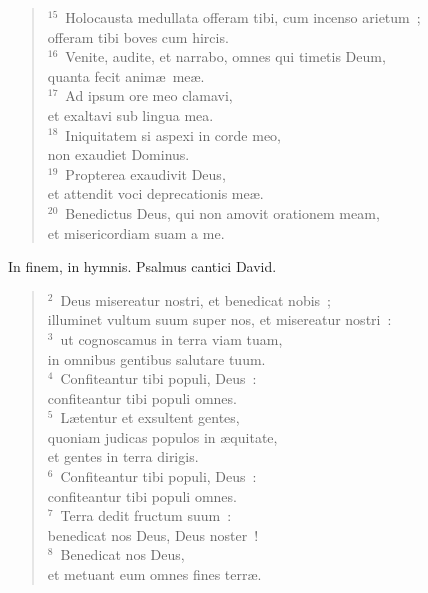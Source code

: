 \begin{flushleft}
\begin{verse}
${}^{15}$~Holocausta medullata offeram tibi, cum incenso arietum~;\\ offeram tibi boves cum hircis.\\
${}^{16}$~Venite, audite, et narrabo, omnes qui timetis Deum,\\ quanta fecit anim\ae\ me\ae .\\
${}^{17}$~Ad ipsum ore meo clamavi,\\ et exaltavi sub lingua mea.\\
${}^{18}$~Iniquitatem si aspexi in corde meo,\\ non exaudiet Dominus.\\
${}^{19}$~Propterea exaudivit Deus,\\ et attendit voci deprecationis me\ae .\\
${}^{20}$~Benedictus Deus, qui non amovit orationem meam,\\ et misericordiam suam a me.\end{verse}\end{flushleft}



\lettrine[lines=3,image=true,loversize=0.05,lraise=-0.03]{I}{}n finem, in hymnis. Psalmus cantici David.
\begin{flushleft}\begin{verse}\vspace{6pt}${}^{2}$~Deus misereatur nostri, et benedicat nobis~;\\ illuminet vultum suum super nos, et misereatur nostri~:\\
${}^{3}$~ut cognoscamus in terra viam tuam,\\ in omnibus gentibus salutare tuum.\\
${}^{4}$~Confiteantur tibi populi, Deus~:\\ confiteantur tibi populi omnes.\\
${}^{5}$~L\ae tentur et exsultent gentes,\\ quoniam judicas populos in \ae quitate,\\ et gentes in terra dirigis.\\
${}^{6}$~Confiteantur tibi populi, Deus~:\\ confiteantur tibi populi omnes.\\
${}^{7}$~Terra dedit fructum suum~:\\ benedicat nos Deus, Deus noster~!\\
${}^{8}$~Benedicat nos Deus,\\ et metuant eum omnes fines terr\ae .\end{verse}\end{flushleft}



